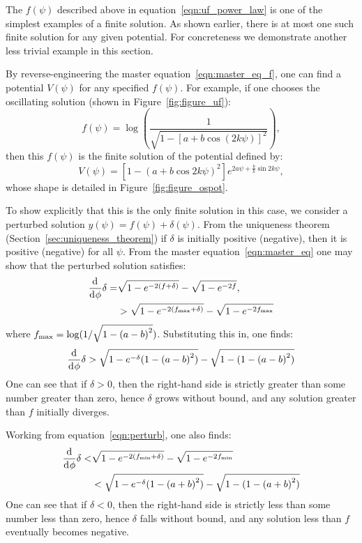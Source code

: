 %
The \(f(\psi)\) described above in equation~\eqref{eqn:uf_power_law} is one of the simplest examples of a finite solution. As shown earlier, there is at most one such finite solution for any given potential. For concreteness we demonstrate another less trivial example in this section.

By reverse-engineering the master equation~\eqref{eqn:master_eq_f}, one can find a potential \(V(\psi)\) for any specified \(f(\psi)\). For example, if one chooses the oscillating solution (shown in Figure~\ref{fig:figure_uf}):
%
\begin{equation}
  f(\psi) = \log\left( \frac{1}{\sqrt{1-{[a+b\cos(2k\psi)]}^2}}\right),
  \label{eqn:uf_example}
\end{equation}
%
then this \(f(\psi)\) is the finite solution of the potential defined by:
%
\begin{equation}
	V(\psi)
    =
    \left[ 1-{(a+b \cos2k\psi)}^2 \right]
    e^{2 a \psi +\frac{b}{k} \sin 2k\psi},
    \label{eqn:Vphi_uf_example}
\end{equation}
whose shape is detailed in Figure~\ref{fig:figure_ospot}.
%

To show explicitly that this is the only finite solution in this case, we consider a perturbed solution \(y(\psi) = f(\psi)+\delta(\psi)\).  From the uniqueness theorem (Section~\ref{sec:uniqueness_theorem}) if \(\delta\) is initially positive (negative), then it is positive (negative) for all \(\psi\). From the master equation~\eqref{eqn:master_eq} one may show that the perturbed solution satisfies:
%
\begin{align}
  \frac{\operatorname{d}^{}\!{}}{\operatorname{d}^{}\!{\phi}}\delta 
  =& 
  \sqrt{1-e^{-2(f+\delta)}} -\sqrt{1-e^{-2f}}, 
  \label{eqn:perturb}
  \\
  &>
  \sqrt{1-e^{-2(f_\mathrm{max}+\delta)}} -\sqrt{1-e^{-2f_\mathrm{max}}}
\end{align}
%
where \(f_\mathrm{max} = \log(1/\sqrt{1-{(a-b)}^2})\). Substituting this in, one finds:
%
\begin{align}
  \frac{\operatorname{d}^{}\!{}}{\operatorname{d}^{}\!{\phi}}\delta 
  > 
  \sqrt{1-e^{-\delta}({1-{(a-b)}^2})} - \sqrt{1-({1-{(a-b)}^2})}
\end{align}
%
One can see that if \(\delta>0\), then the right-hand side is strictly greater than some number greater than zero, hence \(\delta\) grows without bound, and any solution greater than \(f\) initially diverges. 

Working from equation~\eqref{eqn:perturb}, one also finds:
%
\begin{align}
  \frac{\operatorname{d}^{}\!{}}{\operatorname{d}^{}\!{\phi}}\delta 
  <&
  \sqrt{1-e^{-2(f_\mathrm{min}+\delta)}} -\sqrt{1-e^{-2f_\mathrm{min}}} 
  \nonumber
  \\
  &<
  \sqrt{1-e^{-\delta}({1-{(a+b)}^2})} - \sqrt{1-({1-{(a+b)}^2})}
\end{align}
%
One can see that if \(\delta<0\), then the right-hand side is strictly less than some number less than zero, hence \(\delta\) falls without bound, and any solution less than \(f\) eventually becomes negative. 

